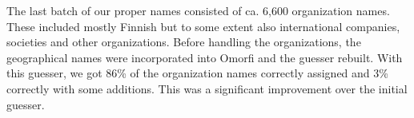 \documentclass{llncs}
\begin{document}
The last batch of our proper names consisted of ca. 6,600
organization names. These included mostly Finnish but to some extent
also international companies, societies and other
organizations. Before handling the organizations, the geographical
names were incorporated into Omorfi and the guesser rebuilt. With this
guesser, we got 86\% of the organization names correctly assigned 
and 3\% correctly with some additions. This was a significant improvement over the 
initial guesser.

% 
% 
\end{document}
